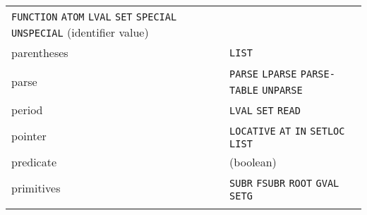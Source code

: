\documentclass[a4paper,]{article}
\begin{document}
\begin{longtable}[]{@{}ll@{}}
\begin{minipage}[t]{0.83\columnwidth}
\texttt{FUNCTION} \texttt{ATOM} \texttt{LVAL} \texttt{SET} \texttt{SPECIAL} \texttt{UNSPECIAL} (identifier value)\strut
\end{minipage}\tabularnewline
\begin{minipage}[t]{0.11\columnwidth}\raggedright\strut
parentheses\strut
\end{minipage} & \begin{minipage}[t]{0.83\columnwidth}\raggedright\strut
\texttt{LIST}\strut
\end{minipage}\tabularnewline
\begin{minipage}[t]{0.11\columnwidth}\raggedright\strut
parse\strut
\end{minipage} & \begin{minipage}[t]{0.83\columnwidth}\raggedright\strut
\texttt{PARSE} \texttt{LPARSE} \texttt{PARSE-TABLE} \texttt{UNPARSE}\strut
\end{minipage}\tabularnewline
\begin{minipage}[t]{0.11\columnwidth}\raggedright\strut
period\strut
\end{minipage} & \begin{minipage}[t]{0.83\columnwidth}\raggedright\strut
\texttt{LVAL} \texttt{SET} \texttt{READ}\strut
\end{minipage}\tabularnewline
\begin{minipage}[t]{0.11\columnwidth}\raggedright\strut
pointer\strut
\end{minipage} & \begin{minipage}[t]{0.83\columnwidth}\raggedright\strut
\texttt{LOCATIVE} \texttt{AT} \texttt{IN} \texttt{SETLOC} \texttt{LIST}\strut
\end{minipage}\tabularnewline
\begin{minipage}[t]{0.11\columnwidth}\raggedright\strut
predicate\strut
\end{minipage} & \begin{minipage}[t]{0.83\columnwidth}\raggedright\strut
(boolean)\strut
\end{minipage}\tabularnewline
\begin{minipage}[t]{0.11\columnwidth}\raggedright\strut
primitives\strut
\end{minipage} & \begin{minipage}[t]{0.83\columnwidth}\raggedright\strut
\texttt{SUBR} \texttt{FSUBR} \texttt{ROOT} \texttt{GVAL} \texttt{SETG}\strut
\end{minipage}\tabularnewline
\begin{minipage}[t]{0.11\columnwidth}\raggedright\strut

\end{minipage}
\end{longtable}
\end{document}
